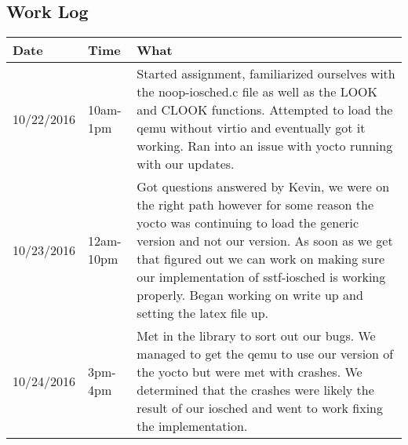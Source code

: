 \documentclass[letterpaper,10pt,titlepage]{article}
\begin{document}
\subsection{Work Log}
\begin{tabular}{ |p{3cm}|p{3cm}|p{5cm}| } 
\hline

Date & Time & What \\
\hline
10/22/2016& 10am-1pm&Started assignment, familiarized ourselves with the noop-iosched.c file as well as the LOOK and CLOOK functions. Attempted to load the qemu without virtio and eventually got it working. Ran into an issue with yocto running with our updates. \\
 \hline
10/23/2016& 12am-10pm&Got questions answered by Kevin, we were on the right path however for some reason the yocto was continuing to load the generic version and not our version. As soon as we get that figured out we can work on making sure our implementation of sstf-iosched is working properly. Began working on write up and setting the latex file up. \\
 \hline
10/24/2016& 3pm-4pm&Met in the library to sort out our bugs. We managed to get the qemu to use our version of the yocto but were met with crashes. We determined that the crashes were likely the result of our iosched and went to work fixing the implementation. \\


 \hline
\end{tabular}
\end{document}
